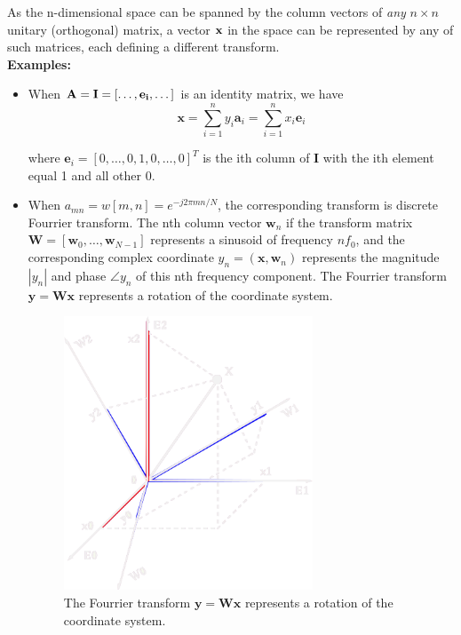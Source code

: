 \documentclass[10pt,b5paper,titlepage]{book}
\begin{document}
As the n-dimensional space can be spanned by the column vectors of \textit{any} $n \times n$ unitary (orthogonal) matrix, a vector  $\bf{x}$ in the space can be represented by any of such matrices, each defining a different transform.\\

\textbf{Examples:}
\begin{itemize}
    \item When $\bf{A} = \mathbf{I} = [\dots, \mathbf{e}_i, \dots]$ is an identity matrix, we have
        \begin{equation}
            \mathbf{x} = \sum_{i=1}^{n} y_i \mathbf{a}_i = \sum_{i=1}^{n} x_i \mathbf{e}_i
        \end{equation}

        where $\mathbf{e}_i = [0, \dots, 0, 1, 0, \dots, 0]^{T}$ is the ith column of  $\mathbf{I}$ with the ith element equal 1 and all other 0.

    \item When $a_{mn} = w[m,n] = e^{-j 2 \pi m n / N}$, the corresponding
        transform is discrete Fourrier transform. The nth column vector
        $\mathbf{w}_n$ if the transform matrix
        $\mathbf{W} = [\mathbf{w}_0, \dots, \mathbf{w}_{N-1}]$
        represents a sinusoid of frequency  $n f_0$,
        and the corresponding complex coordinate
        $y_n = (\mathbf{x}, \mathbf{w}_n)$ represents the magnitude
        $|y_n|$ and phase $\angle y_n$
        of this nth frequency component. The Fourrier transform
        $\mathbf{y} = \mathbf{W} \mathbf{x}$ represents a rotation of the coordinate
        system.\\

        \begin{figure}[htpb]
            \centering
            \includegraphics[width=0.7\textwidth]{./img/unitary_transform_2_inv}
            \caption{The Fourrier transform $\mathbf{y} = \mathbf{W} \mathbf{x}$ represents a rotation of the coordinate system.}
            \label{fig:unitary_transform_2}
        \end{figure}


\end{itemize}
\end{document}
